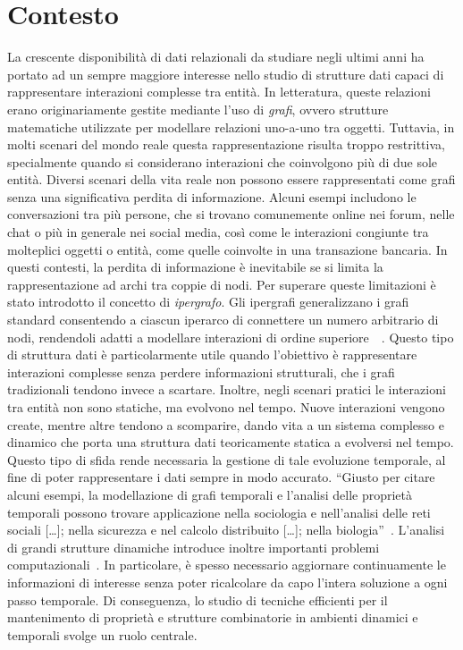 
\section{Contesto}\label{sec:contesto}

La crescente disponibilità di dati relazionali da studiare negli ultimi anni ha portato ad un sempre maggiore interesse nello studio di strutture dati capaci di rappresentare interazioni complesse tra entità.
In letteratura, queste relazioni erano originariamente gestite mediante l'uso di \emph{grafi}, ovvero strutture matematiche utilizzate per modellare relazioni uno-a-uno tra oggetti.
Tuttavia, in molti scenari del mondo reale questa rappresentazione risulta troppo restrittiva, specialmente quando si considerano interazioni che coinvolgono più di due sole entità.
Diversi scenari della vita reale non possono essere rappresentati come grafi senza una significativa perdita di informazione.
Alcuni esempi includono le conversazioni tra più persone, che si trovano comunemente online nei forum, nelle chat o più in generale nei social media, così come le interazioni congiunte tra molteplici oggetti o entità, come quelle coinvolte in una transazione bancaria.
In questi contesti, la perdita di informazione è inevitabile se si limita la rappresentazione ad archi tra coppie di nodi.
Per superare queste limitazioni è stato introdotto il concetto di \emph{ipergrafo}.
Gli ipergrafi generalizzano i grafi standard consentendo a ciascun iperarco di connettere un numero arbitrario di nodi, rendendoli adatti a modellare interazioni di ordine superiore~\cite{antelmi2023}~\cite{bretto2013}.
Questo tipo di struttura dati è particolarmente utile quando l'obiettivo è rappresentare interazioni complesse senza perdere informazioni strutturali, che i grafi tradizionali tendono invece a scartare.
Inoltre, negli scenari pratici le interazioni tra entità non sono statiche, ma evolvono nel tempo.
Nuove interazioni vengono create, mentre altre tendono a scomparire, dando vita a un sistema complesso e dinamico che porta una struttura dati teoricamente statica a evolversi nel tempo.
Questo tipo di sfida rende necessaria la gestione di tale evoluzione temporale, al fine di poter rappresentare i dati sempre in modo accurato.
``Giusto per citare alcuni esempi, la modellazione di grafi temporali e l'analisi delle proprietà temporali possono trovare applicazione nella sociologia e nell'analisi delle reti sociali [\ldots]; nella sicurezza e nel calcolo distribuito [\ldots]; nella biologia''~\cite{lotito2020}.
L'analisi di grandi strutture dinamiche introduce inoltre importanti problemi computazionali~\cite{lotito2020}.
In particolare, è spesso necessario aggiornare continuamente le informazioni di interesse senza poter ricalcolare da capo l'intera soluzione a ogni passo temporale.
Di conseguenza, lo studio di tecniche efficienti per il mantenimento di proprietà e strutture combinatorie in ambienti dinamici e temporali svolge un ruolo centrale.